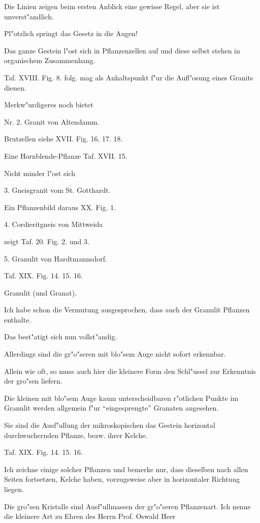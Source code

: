 \documentclass[a4paper, 11pt, oneside, german]{article}
\begin{document}
Die Linien zeigen beim ersten Anblick eine gewisse Regel, aber sie ist unverst"andlich.

Pl"otzlich springt das Gesetz in die Augen!

Das ganze Gestein l"ost sich in Pflanzenzellen auf und diese selbst stehen in organischem Zusammenhang.

Taf. XVIII. Fig. 8. folg. mag als Anhaltspunkt f"ur die Aufl"osung eines Granits dienen.

Merkw"urdigeres noch bietet

Nr. 2. Granit von Altendamm.

Brutzellen siehe XVII. Fig. 16. 17. 18.

Eine Hornblende-Pflanze Taf. XVII. 15.

Nicht minder l"ost sich

3. Gneisgranit vom St. Gotthardt.

Ein Pflanzenbild daraus XX. Fig. 1.

4. Cordieritgneis von Mittweida

zeigt Taf. 20. Fig. 2. und 3.

5. Granulit von Hardtmannsdorf.

Taf. XIX. Fig. 14. 15. 16.

Granulit (und Granat).

Ich habe schon die Vermutung ausgesprochen, dass auch der Granulit Pflanzen enthalte.

Das best"atigt sich nun vollst"andig.

Allerdings sind die gr"o"seren mit blo"sem Auge nicht sofort erkennbar.

Allein wie oft, so muss auch hier die kleinere Form den Schl"ussel zur Erkenntnis der gro"sen liefern.

Die kleinen mit blo"sem Auge kaum unterscheidbaren r"otlichen Punkte im Granulit werden allgemein f"ur "`eingesprengte"' Granaten angesehen.

Sie sind die Ausf"ullung der mikroskopischen das Gestein horizontal durchwuchernden Pflanze, bezw. ihrer Kelche.

Taf. XIX. Fig. 14. 15. 16.

Ich zeichne einige solcher Pflanzen und bemerke nur, dass dieselben nach allen Seiten fortsetzen, Kelche haben, vorzugsweise aber in horizontaler Richtung liegen.

Die gro"sen Kristalle sind Ausf"ullmassen der gr"o"seren Pflanzenart. Ich nenne die kleinere Art zu Ehren des Herrn Prof. Oswald Heer
\end{document}
